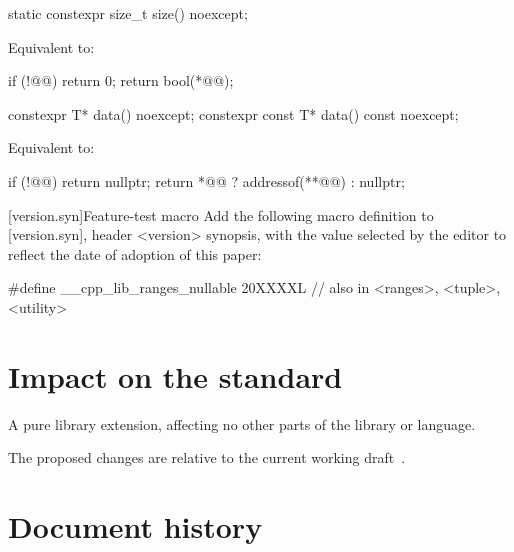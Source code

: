 \documentclass[a4paper,10pt,oneside,openany,final,article]{memoir}
\begin{document}
\begin{wording}
\begin{itemdecl}
  static constexpr size_t size() noexcept;
\end{itemdecl}

\begin{itemdescr}
  \pnum{}
  \effects{}
  Equivalent to:

  \begin{codeblock}
    if (!@@)
      return 0;
    return bool(*@@);
  \end{codeblock}
\end{itemdescr}

\begin{itemdecl}
  constexpr T* data() noexcept;
  constexpr const T* data() const noexcept;
\end{itemdecl}

\begin{itemdescr}
\pnum{}
\effects{}
Equivalent to:
\begin{codeblock}
  if (!@@)
    return nullptr;
  return *@@ ? addressof(**@@) : nullptr;
\end{codeblock}
\end{itemdescr}

[version.syn]{Feature-test macro}
Add the following macro definition to [version.syn], header <version> synopsis, with the value selected by the editor to reflect the date of adoption of this paper:

\begin{codeblock}
  #define __cpp_lib_ranges_nullable 20XXXXL // also in <ranges>, <tuple>, <utility>
\end{codeblock}

\end{wording}

\chapter{Impact on the standard}

A pure library extension, affecting no other parts of the library or language.

The proposed changes are relative to the current working draft~\cite{N4958}.

\chapter*{Document history}
\end{document}
